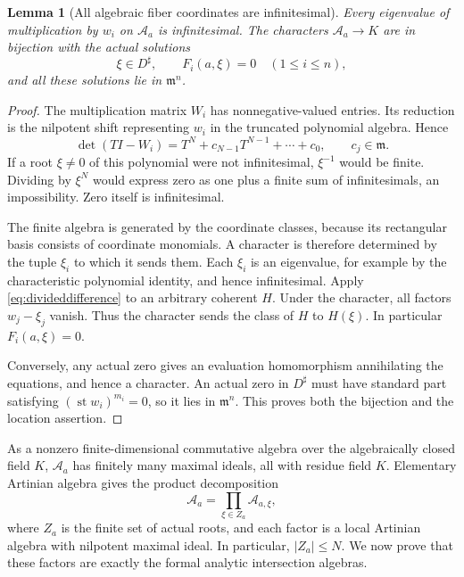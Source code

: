 \documentclass[11pt,oneside]{article}
\numberwithin{equation}{section}
\newtheorem{lemma}[theorem]{Lemma}
\theoremstyle{definition}
\theoremstyle{remark}\newtheorem{remark}[theorem]{Remark}
\newcommand{\mm}{\mathfrak m}
\newcommand{\sh}{^{\sharp}}
\newcommand{\st}{\operatorname{st}}
\begin{document}
\begin{lemma}[All algebraic fiber coordinates are infinitesimal]\label{lem:infcoords}
Every eigenvalue of multiplication by \(w_i\) on \(\mathcal A_a\) is infinitesimal. The characters \(\mathcal A_a\to K\) are in bijection with the actual solutions
\[
 \xi\in D\sh,\qquad F_i(a,\xi)=0\quad(1\leq i\leq n),
\]
and all these solutions lie in \(\mm^n\).
\end{lemma}
\begin{proof}
The multiplication matrix \(W_i\) has nonnegative-valued entries. Its reduction is the nilpotent shift representing \(w_i\) in the truncated polynomial algebra. Hence
\[
 \det(TI-W_i)=T^N+c_{N-1}T^{N-1}+\cdots+c_0,
 \qquad c_j\in\mm.
\]
If a root \(\xi\ne0\) of this polynomial were not infinitesimal, \(\xi^{-1}\) would be finite. Dividing by \(\xi^N\) would express zero as one plus a finite sum of infinitesimals, an impossibility. Zero itself is infinitesimal.

The finite algebra is generated by the coordinate classes, because its rectangular basis consists of coordinate monomials. A character is therefore determined by the tuple \(\xi_i\) to which it sends them. Each \(\xi_i\) is an eigenvalue, for example by the characteristic polynomial identity, and hence infinitesimal. Apply \eqref{eq:divideddifference} to an arbitrary coherent \(H\). Under the character, all factors \(w_j-\xi_j\) vanish. Thus the character sends the class of \(H\) to \(H(\xi)\). In particular \(F_i(a,\xi)=0\).

Conversely, any actual zero gives an evaluation homomorphism annihilating the equations, and hence a character. An actual zero in \(D\sh\) must have standard part satisfying \((\st w_i)^{m_i}=0\), so it lies in \(\mm^n\). This proves both the bijection and the location assertion.
\end{proof}

As a nonzero finite-dimensional commutative algebra over the algebraically closed field \(K\), \(\mathcal A_a\) has finitely many maximal ideals, all with residue field \(K\). Elementary Artinian algebra gives the product decomposition
\begin{equation}\label{eq:artinianproduct}
 \mathcal A_a=\prod_{\xi\in Z_a}\mathcal A_{a,\xi},
\end{equation}
where \(Z_a\) is the finite set of actual roots, and each factor is a local Artinian algebra with nilpotent maximal ideal. In particular, \(|Z_a|\leq N\). We now prove that these factors are exactly the formal analytic intersection algebras.
\end{document}
